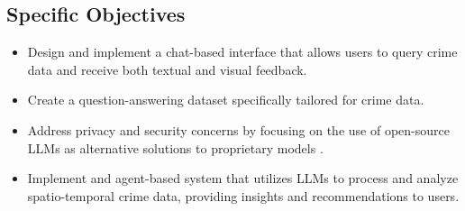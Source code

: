 \subsection{Specific Objectives}
\begin{itemize}
    \item Design and implement a chat-based interface that allows users to query crime data and receive both textual and visual feedback.
    \item Create a question-answering dataset specifically tailored for crime data.
    \item Address privacy and security concerns by focusing on the use of open-source LLMs as alternative solutions to proprietary models \cite{Temsah2025DeepSeek, Ersoz2025CrimePredictionXAISurvey}. 
    \item Implement and agent-based system that utilizes LLMs to process and analyze spatio-temporal crime data, providing insights and recommendations to users.
\end{itemize}

